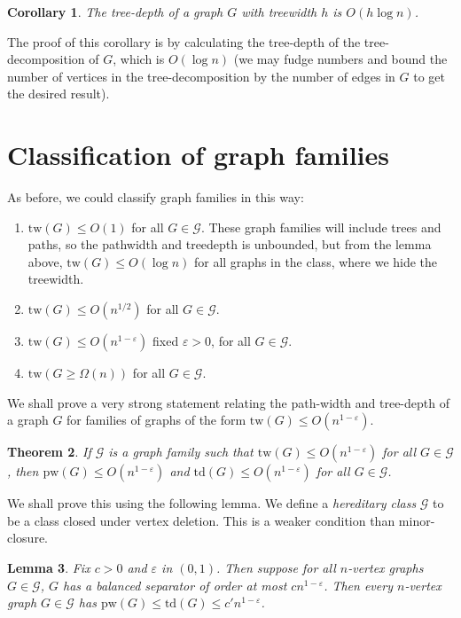\documentclass[]{article}
\newcommand{\tw}{\text{tw}}
\newcommand{\pw}{\text{pw}}
\newcommand{\td}{\text{td}}
\newtheorem{theorem}{Theorem}
\newtheorem{corollary}[theorem]{Corollary}
\newtheorem{lemma}[theorem]{Lemma}
\theoremstyle{definition}
\numberwithin{theorem}{section}
\numberwithin{equation}{section}
\begin{document}
\begin{corollary}
	The tree-depth of a graph $G$ with treewidth $h$ is $O(h \log n)$.
\end{corollary}
The proof of this corollary is by calculating the tree-depth of the tree-decomposition of $G$, which is $O(\log n)$ (we may fudge numbers and bound the number of vertices in the tree-decomposition by the number of edges in $G$ to get the desired result).

\section{Classification of graph families}
As before, we could classify graph families in this way:
\begin{enumerate}
	\item $\tw(G) \leq O(1)$ for all $G \in \mathcal{G}$. These graph families will include trees and paths, so the pathwidth and treedepth is unbounded, but from the lemma above, $\tw(G) \leq O(\log n)$ for all graphs in the class, where we hide the treewidth.
	\item $\tw(G) \leq O(n^{1/2})$ for all $G \in \mathcal{G}$.
	\item $\tw(G) \leq O(n^{1- \varepsilon})$ fixed $\varepsilon > 0$, for all $G \in \mathcal{G}$.
	\item $\tw(G \geq \Omega(n))$ for all $G \in \mathcal{G}$.
\end{enumerate}
We shall prove a very strong statement relating the path-width and tree-depth of a graph $G$ for families of graphs of the form $\tw(G) \leq O(n^{1- \varepsilon})$. 
\begin{theorem}
	If $\mathcal{G}$ is a graph family such that $\tw(G) \leq O(n^{1- \varepsilon})$ for all $G \in \mathcal{G}$, then $\pw(G) \leq O(n^{1-\varepsilon})$ and $\td(G) \leq O(n^{1-\varepsilon})$ for all $G \in \mathcal{G}$.
\end{theorem}
We shall prove this using the following lemma. We define a \textit{hereditary class} $\mathcal{G}$ to be a class closed under vertex deletion. This is a weaker condition than minor-closure. 
\begin{lemma}
	Fix $c > 0$ and $\varepsilon$ in $(0, 1)$. Then suppose for all $n$-vertex graphs $G \in \mathcal{G}$, $G$ has a balanced separator of order at most $c n^{1-\varepsilon}$. Then every $n$-vertex graph $G \in \mathcal{G}$ has $\pw(G) \leq \td(G) \leq c' n^{1- \varepsilon}$. 
\end{lemma}
\end{document}
